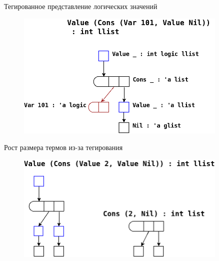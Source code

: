 \documentclass[10pt, mathserif]{beamer}
\theoremstyle{definition}
\begin{document}
\begin{frame}[fragile]{Тегированное представление логических значений}
  \begin{figure}
  \centering
  \includegraphics[width=0.9\textwidth]{img3.png}
  \end{figure}
\end{frame}

\begin{frame}[fragile]{Рост размера термов из-за тегирования}
\begin{figure}
\centering
\includegraphics[width=0.9\textwidth]{img4.png}
\end{figure}
\end{frame}
\end{document}
